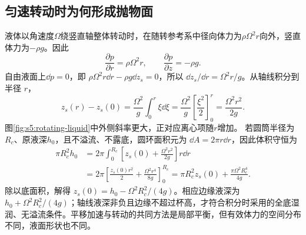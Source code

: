 \subsection{匀速转动时为何形成抛物面}
液体以角速度$\Omega$绕竖直轴整体转动时，在随转参考系中径向体力为$\rho\Omega^2r$向外，竖直体力为$-\rho g$。因此
\[
\frac{\partial p}{\partial r}=\rho\Omega^2r,\qquad
\frac{\partial p}{\partial z}=-\rho g.
\]
自由液面上$\dd p=0$，即 $\rho\Omega^2r\dd r-\rho g\dd z_s=0$，所以 $\dd z_s/\dd r=\Omega^2r/g$。从轴线积分到半径 $r$，
\[z_s(r)-z_s(0)=\frac{\Omega^2}{g}\int_0^r\xi\dd\xi
 =\frac{\Omega^2}{g}\left[\frac{\xi^2}{2}\right]_0^r
 =\frac{\Omega^2r^2}{2g}.\]
图\ref{fig:s5:rotating-liquid}中外侧斜率更大，正对应离心项随$r$增加。
若圆筒半径为$R_c$、原液深$h_0$，且不溢流、不露底，圆环面积元为 $\dd A=2\pi r\dd r$，因此体积守恒为
\begin{align*}
 \pi R_c^2h_0
 &=2\pi\int_0^{R_c}\left[z_s(0)+\frac{\Omega^2r^2}{2g}\right]r\dd r\\
 &=2\pi\left[\frac{z_s(0)r^2}{2}+\frac{\Omega^2r^4}{8g}\right]_0^{R_c}
 =\pi R_c^2z_s(0)+\frac{\pi\Omega^2R_c^4}{4g}.
\end{align*}
除以底面积，解得 $z_s(0)=h_0-\Omega^2R_c^2/(4g)$。相应边缘液深为 $h_0+\Omega^2R_c^2/(4g)$；轴线液深非负且边缘不超过杯高，才符合积分时采用的全底湿润、无溢流条件。平移加速与转动的共同方法是局部平衡，但有效体力的空间分布不同，液面形状也不同。


